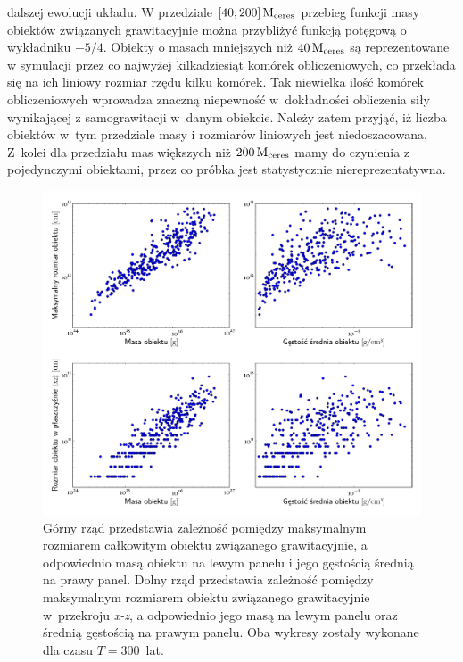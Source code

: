 dalszej ewolucji układu. W przedziale $[40, 200]\hbox{$\mathrm{\thinspace M_{\textrm{ceres}}}$}$ przebieg funkcji masy
obiektów związanych grawitacyjnie można przybliżyć funkcją potęgową o wykładniku
$-5/4$. Obiekty o masach mniejszych niż $40\hbox{$\mathrm{\thinspace M_{\textrm{ceres}}}$}$ są reprezentowane w
symulacji przez co najwyżej kilkadziesiąt komórek obliczeniowych, co przekłada
się na ich liniowy rozmiar rzędu kilku komórek. Tak niewielka ilość komórek
obliczeniowych wprowadza znaczną niepewność w~dokładności obliczenia
siły wynikającej z samograwitacji w~danym obiekcie. Należy zatem przyjąć, iż
liczba obiektów w~tym przedziale masy i rozmiarów liniowych jest 
niedoszacowana. Z~kolei dla przedziału mas większych niż $200\hbox{$\mathrm{\thinspace M_{\textrm{ceres}}}$}$ mamy
do czynienia z pojedynczymi obiektami, przez co próbka jest statystycznie
niereprezentatywna.
%
\begin{figure}[ht]
   \centering
   \includegraphics[width=0.99\linewidth]{figures/fig_mass_size}
   \caption[Zależności pomiędzy rozmiarami obiektów związanych grawitacyjnie, a
   ich masami i gęstościami.]
     {Górny rząd przedstawia zależność pomiędzy maksymalnym rozmiarem
      całkowitym obiektu związanego grawitacyjnie, a odpowiednio masą obiektu na
      lewym panelu i jego gęstością średnią na prawy panel. Dolny rząd
      przedstawia zależność pomiędzy maksymalnym rozmiarem obiektu związanego
   grawitacyjnie w~przekroju \emph{x-z}, a odpowiednio jego masą na lewym panelu
oraz średnią gęstością na prawym panelu. Oba  wykresy zostały wykonane dla czasu
$T=300$~lat. }
   \label{fig:mass_size}
\end{figure}
